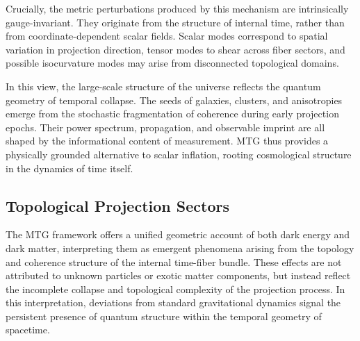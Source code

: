 \documentclass[11pt]{article}
\begin{document}

Crucially, the metric perturbations produced by this mechanism are intrinsically gauge-invariant. They originate from the structure of internal time, rather than from coordinate-dependent scalar fields. Scalar modes correspond to spatial variation in projection direction, tensor modes to shear across fiber sectors, and possible isocurvature modes may arise from disconnected topological domains.

In this view, the large-scale structure of the universe reflects the quantum geometry of temporal collapse. The seeds of galaxies, clusters, and anisotropies emerge from the stochastic fragmentation of coherence during early projection epochs. Their power spectrum, propagation, and observable imprint are all shaped by the informational content of measurement. MTG thus provides a physically grounded alternative to scalar inflation, rooting cosmological structure in the dynamics of time itself.

\subsection{Topological Projection Sectors}

The MTG framework offers a unified geometric account of both dark energy and dark matter, interpreting them as emergent phenomena arising from the topology and coherence structure of the internal time-fiber bundle. These effects are not attributed to unknown particles or exotic matter components, but instead reflect the incomplete collapse and topological complexity of the projection process. In this interpretation, deviations from standard gravitational dynamics signal the persistent presence of quantum structure within the temporal geometry of spacetime.
\end{document}
